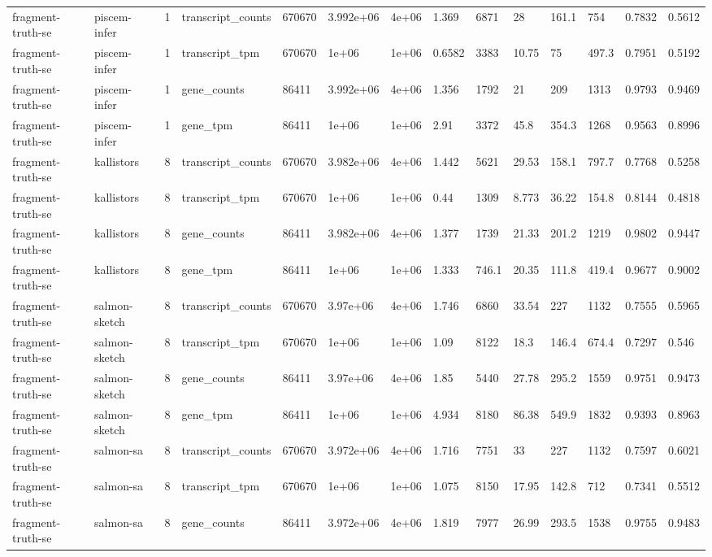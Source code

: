 \begin{tabular}{llllllllllllll}
fragment-truth-se & piscem-infer & 1 & transcript\_counts & 670670 & 3.992e+06 & 4e+06 & 1.369 & 6871 & 28 & 161.1 & 754 & 0.7832 & 0.5612 \\
fragment-truth-se & piscem-infer & 1 & transcript\_tpm & 670670 & 1e+06 & 1e+06 & 0.6582 & 3383 & 10.75 & 75 & 497.3 & 0.7951 & 0.5192 \\
fragment-truth-se & piscem-infer & 1 & gene\_counts & 86411 & 3.992e+06 & 4e+06 & 1.356 & 1792 & 21 & 209 & 1313 & 0.9793 & 0.9469 \\
fragment-truth-se & piscem-infer & 1 & gene\_tpm & 86411 & 1e+06 & 1e+06 & 2.91 & 3372 & 45.8 & 354.3 & 1268 & 0.9563 & 0.8996 \\
fragment-truth-se & kallistors & 8 & transcript\_counts & 670670 & 3.982e+06 & 4e+06 & 1.442 & 5621 & 29.53 & 158.1 & 797.7 & 0.7768 & 0.5258 \\
fragment-truth-se & kallistors & 8 & transcript\_tpm & 670670 & 1e+06 & 1e+06 & 0.44 & 1309 & 8.773 & 36.22 & 154.8 & 0.8144 & 0.4818 \\
fragment-truth-se & kallistors & 8 & gene\_counts & 86411 & 3.982e+06 & 4e+06 & 1.377 & 1739 & 21.33 & 201.2 & 1219 & 0.9802 & 0.9447 \\
fragment-truth-se & kallistors & 8 & gene\_tpm & 86411 & 1e+06 & 1e+06 & 1.333 & 746.1 & 20.35 & 111.8 & 419.4 & 0.9677 & 0.9002 \\
fragment-truth-se & salmon-sketch & 8 & transcript\_counts & 670670 & 3.97e+06 & 4e+06 & 1.746 & 6860 & 33.54 & 227 & 1132 & 0.7555 & 0.5965 \\
fragment-truth-se & salmon-sketch & 8 & transcript\_tpm & 670670 & 1e+06 & 1e+06 & 1.09 & 8122 & 18.3 & 146.4 & 674.4 & 0.7297 & 0.546 \\
fragment-truth-se & salmon-sketch & 8 & gene\_counts & 86411 & 3.97e+06 & 4e+06 & 1.85 & 5440 & 27.78 & 295.2 & 1559 & 0.9751 & 0.9473 \\
fragment-truth-se & salmon-sketch & 8 & gene\_tpm & 86411 & 1e+06 & 1e+06 & 4.934 & 8180 & 86.38 & 549.9 & 1832 & 0.9393 & 0.8963 \\
fragment-truth-se & salmon-sa & 8 & transcript\_counts & 670670 & 3.972e+06 & 4e+06 & 1.716 & 7751 & 33 & 227 & 1132 & 0.7597 & 0.6021 \\
fragment-truth-se & salmon-sa & 8 & transcript\_tpm & 670670 & 1e+06 & 1e+06 & 1.075 & 8150 & 17.95 & 142.8 & 712 & 0.7341 & 0.5512 \\
fragment-truth-se & salmon-sa & 8 & gene\_counts & 86411 & 3.972e+06 & 4e+06 & 1.819 & 7977 & 26.99 & 293.5 & 1538 & 0.9755 & 0.9483 \\

\end{tabular}
